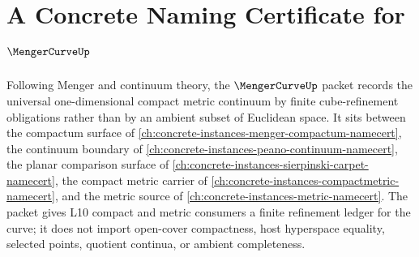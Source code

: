 \chapter{A Concrete Naming Certificate for $\MengerCurveUp$}
\label{ch:concrete-instances-menger-curve-namecert}

Following Menger and continuum theory, the $\MengerCurveUp$ packet records the universal one-dimensional compact metric continuum by finite cube-refinement obligations rather than by an ambient subset of Euclidean space. It sits between the compactum surface of \autoref{ch:concrete-instances-menger-compactum-namecert}, the continuum boundary of \autoref{ch:concrete-instances-peano-continuum-namecert}, the planar comparison surface of \autoref{ch:concrete-instances-sierpinski-carpet-namecert}, the compact metric carrier of \autoref{ch:concrete-instances-compactmetric-namecert}, and the metric source of \autoref{ch:concrete-instances-metric-namecert}. The packet gives L10 compact and metric consumers a finite refinement ledger for the curve; it does not import open-cover compactness, host hyperspace equality, selected points, quotient continua, or ambient completeness.

